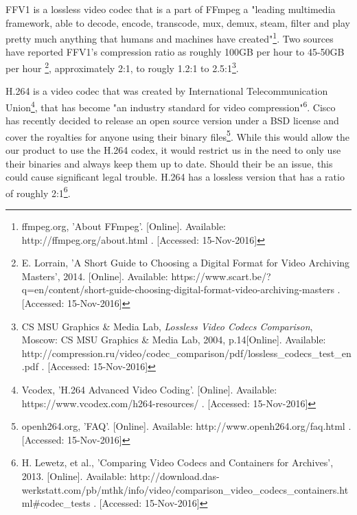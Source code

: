 \documentclass[letterpaper,10pt,onecolumn,draftclsnofoot]{IEEEtran}
\begin{document}
FFV1 is a lossless video codec that is a part of FFmpeg a "leading multimedia framework, able to decode, encode, transcode, mux, demux, steam, filter and play pretty much anything that humans and machines have created"\footnote{ffmpeg.org, 'About FFmpeg'. [Online]. Available: http://ffmpeg.org/about.html . [Accessed: 15-Nov-2016]}. %
Two sources have reported FFV1's compression ratio as roughly 100GB per hour to 45-50GB per hour \footnote{E. Lorrain, 'A Short Guide to Choosing a Digital Format for Video Archiving Masters', 2014. [Online]. Available: https://www.scart.be/?q=en/content/short-guide-choosing-digital-format-video-archiving-masters . [Accessed: 15-Nov-2016]}, approximately 2:1, to rougly 1.2:1 to 2.5:1\footnote{CS MSU Graphics & Media Lab, \textit{Lossless Video Codecs Comparison}, Moscow: CS MSU Graphics & Media Lab, 2004, p.14[Online]. Available: http://compression.ru/video/codec_comparison/pdf/lossless_codecs_test_en.pdf . [Accessed: 15-Nov-2016]}. %

H.264 is a video codec that was created by International Telecommunication Union\footnote{Vcodex, 'H.264 Advanced Video Coding'. [Online]. Available: https://www.vcodex.com/h264-resources/ . [Accessed: 15-Nov-2016]}, that has become "an industry standard for video compression"\textsuperscript{6}. %
Cisco has recently decided to release an open source version under a BSD license and cover the royalties for anyone using their binary files\footnote{openh264.org, 'FAQ'. [Online]. Available: http://www.openh264.org/faq.html . [Accessed: 15-Nov-2016]}. %
While this would allow the our product to use the H.264 codex, it would restrict us in the need to only use their binaries and always keep them up to date.
Should their be an issue, this could cause significant legal trouble.
H.264 has a lossless version that has a ratio of roughly 2:1\footnote{H. Lewetz, et al., 'Comparing Video Codecs and Containers for Archives', 2013. [Online]. Available: http://download.das-werkstatt.com/pb/mthk/info/video/comparison_video_codecs_containers.html#codec_tests . [Accessed: 15-Nov-2016]}. %



\end{document}
